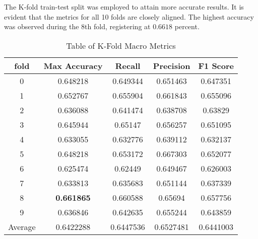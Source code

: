 \documentclass[]{report}
\begin{document}
The K-fold train-test split was employed to attain more accurate results. It is evident that the metrics for all 10 folds are closely aligned. The highest accuracy was observed during the 8th fold, registering at $0.6618$ percent.

\begin{table}[h]
	\centering
	\caption{Table of K-Fold Macro Metrics}
	\begin{tabular}{|c|c|c|c|c|}
		\hline
		\textbf{fold} & \textbf{Max Accuracy} & \textbf{Recall} & \textbf{Precision} & \textbf{F1 Score} \\ \hline
		0       & 0.648218  & 0.649344  & 0.651463  & 0.647351  \\ \hline
		1       & 0.652767  & 0.655904  & 0.661843  & 0.655096  \\ \hline
		2       & 0.636088  & 0.641474  & 0.638708  & 0.63829   \\ \hline
		3       & 0.645944  & 0.65147   & 0.656257  & 0.651095  \\ \hline
		4       & 0.633055  & 0.632776  & 0.639112  & 0.632137  \\ \hline
		5       & 0.648218  & 0.653172  & 0.667303  & 0.652077  \\ \hline
		6       & 0.625474  & 0.62449   & 0.649467  & 0.626003  \\ \hline
		7       & 0.633813  & 0.635683  & 0.651144  & 0.637339  \\ \hline
		8       & \textbf{0.661865}  & 0.660588  & 0.65694   & 0.657756  \\ \hline
		9       & 0.636846  & 0.642635  & 0.655244  & 0.643859  \\ \hline \hline
		Average & 0.6422288 & 0.6447536 & 0.6527481 & 0.6441003 \\ \hline
	\end{tabular}
\end{table}
\end{document}
